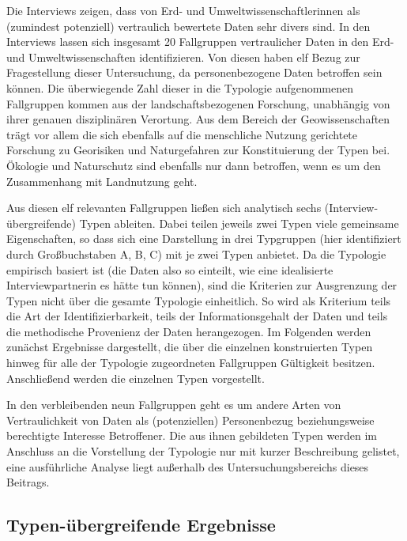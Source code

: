 \documentclass[a4paper,
fontsize=11pt,
oneside,
numbers=noperiodatend,
parskip=half-,
bibliography=totoc,
final
]{scrartcl}
\begin{document}
Die Interviews zeigen, dass von Erd- und Umweltwissenschaftlerinnen als
(zumindest potenziell) vertraulich bewertete Daten sehr divers sind. In
den Interviews lassen sich insgesamt 20 Fallgruppen vertraulicher Daten
in den Erd- und Umweltwissenschaften identifizieren. Von diesen haben
elf Bezug zur Fragestellung dieser Untersuchung, da personenbezogene
Daten betroffen sein können. Die überwiegende Zahl dieser in die
Typologie aufgenommenen Fallgruppen kommen aus der landschaftsbezogenen
Forschung, unabhängig von ihrer genauen disziplinären Verortung. Aus dem
Bereich der Geowissenschaften trägt vor allem die sich ebenfalls auf die
menschliche Nutzung gerichtete Forschung zu Georisiken und Naturgefahren
zur Konstituierung der Typen bei. Ökologie und Naturschutz sind
ebenfalls nur dann betroffen, wenn es um den Zusammenhang mit
Landnutzung geht.

Aus diesen elf relevanten Fallgruppen ließen sich analytisch sechs
(Interview-übergreifende) Typen ableiten. Dabei teilen jeweils zwei
Typen viele gemeinsame Eigenschaften, so dass sich eine Darstellung in
drei Typgruppen (hier identifiziert durch Großbuchstaben A, B, C) mit je
zwei Typen anbietet. Da die Typologie empirisch basiert ist (die Daten
also so einteilt, wie eine idealisierte Interviewpartnerin es hätte tun
können), sind die Kriterien zur Ausgrenzung der Typen nicht über die
gesamte Typologie einheitlich. So wird als Kriterium teils die Art der
Identifizierbarkeit, teils der Informationsgehalt der Daten und teils
die methodische Provenienz der Daten herangezogen. Im Folgenden werden
zunächst Ergebnisse dargestellt, die über die einzelnen konstruierten
Typen hinweg für alle der Typologie zugeordneten Fallgruppen Gültigkeit
besitzen. Anschließend werden die einzelnen Typen vorgestellt.

In den verbleibenden neun Fallgruppen geht es um andere Arten von
Vertraulichkeit von Daten als (potenziellen) Personenbezug
beziehungsweise berechtigte Interesse Betroffener. Die aus ihnen
gebildeten Typen werden im Anschluss an die Vorstellung der Typologie
nur mit kurzer Beschreibung gelistet, eine ausführliche Analyse liegt
außerhalb des Untersuchungsbereichs dieses Beitrags.

\hypertarget{typen-uxfcbergreifende-ergebnisse}{%
\subsection{Typen-übergreifende Ergebnisse}\label{typen-uxfcbergreifende-ergebnisse}}
\end{document}
